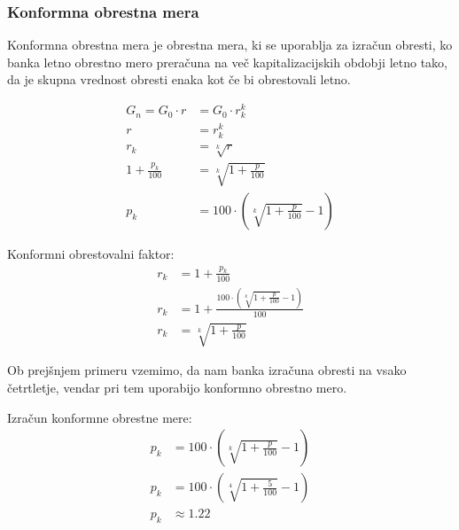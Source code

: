 \documentclass[12pt]{article}
\begin{document}
        \subsubsection{Konformna obrestna mera}
        \label{konformna}
        Konformna obrestna mera je obrestna mera, ki se uporablja za izračun obresti, ko
        banka letno obrestno mero preračuna na več kapitalizacijskih obdobji letno tako, da
        je skupna vrednost obresti enaka kot če bi obrestovali letno.
        
        \begin{equation}
            \begin{split}
                G_n = G_0 \cdot r & = G_0 \cdot r_k^k \\
                r & = r_k^k \\
                r_k & = \sqrt[k]{r} \\
                1 + \frac{p_k}{100} & = \sqrt[k]{1 + \frac{p}{100}} \\
                p_k & = 100 \cdot (\sqrt[k]{1 + \frac{p}{100}} - 1)
            \end{split}
        \end{equation}

        Konformni obrestovalni faktor:
        \begin{equation}
            \begin{split}
                r_k & = 1 + \frac{p_k}{100} \\
                r_k & = 1 + \frac{100 \cdot (\sqrt[k]{1 + \frac{p}{100}} - 1)}{100} \\
                r_k & = \sqrt[k]{1 + \frac{p}{100}}
            \end{split}
        \end{equation}

        Ob prejšnjem primeru vzemimo, da nam banka izračuna obresti na vsako četrtletje,
        vendar pri tem uporabijo konformno obrestno mero.

        Izračun konformne obrestne mere:
        \begin{equation}
            \begin{split}
                p_k & = 100 \cdot (\sqrt[k]{1 + \frac{p}{100}} - 1) \\
                p_k & = 100 \cdot (\sqrt[4]{1 + \frac{5}{100}} - 1) \\
                p_k & \approx 1.22
            \end{split}
        \end{equation}
\end{document}
